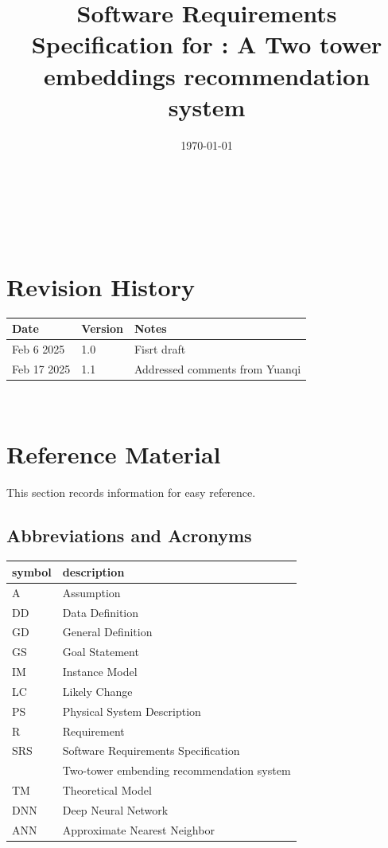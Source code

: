 \documentclass[12pt]{article}
\begin{document}
\title{Software Requirements Specification for \progname: A Two tower embeddings recommendation system} 
\author{\authname}
\date{\today}
	
\maketitle

~\newpage


\tableofcontents

~\newpage

\section*{Revision History}

\begin{tabularx}{\textwidth}{p{3cm}p{2cm}X}
\toprule {\bf Date} & {\bf Version} & {\bf Notes}\\
\midrule
Feb 6 2025 & 1.0 & Fisrt draft\\
Feb 17 2025 & 1.1 & Addressed comments from Yuanqi\\
\bottomrule
\end{tabularx}


~\newpage

\section{Reference Material}

This section records information for easy reference.

\subsection{Abbreviations and Acronyms}

\renewcommand{\arraystretch}{1.2}
\begin{tabular}{l l} 
  \toprule		
  \textbf{symbol} & \textbf{description}\\
  \midrule 
  A & Assumption\\
  DD & Data Definition\\
  GD & General Definition\\
  GS & Goal Statement\\
  IM & Instance Model\\
  LC & Likely Change\\
  PS & Physical System Description\\
  R & Requirement\\
  SRS & Software Requirements Specification\\
  \progname{} & Two-tower embending recommendation system\\
  TM & Theoretical Model\\
  DNN & Deep Neural Network\\
  ANN & Approximate Nearest Neighbor\\
  \bottomrule
\end{tabular}\\
\end{document}
